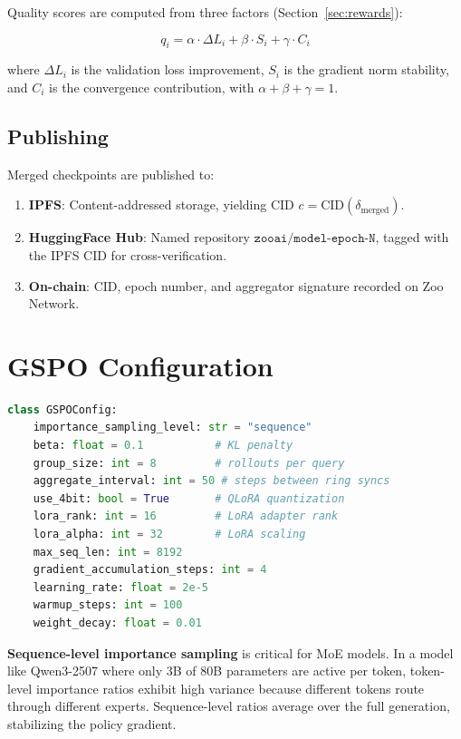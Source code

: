 \documentclass[11pt,letterpaper]{article}
\begin{document}
Quality scores are computed from three factors (Section~\ref{sec:rewards}):

\begin{equation}
    q_i = \alpha \cdot \Delta L_i + \beta \cdot S_i + \gamma \cdot C_i
    \label{eq:quality}
\end{equation}

where $\Delta L_i$ is the validation loss improvement, $S_i$ is the gradient norm stability, and $C_i$ is the convergence contribution, with $\alpha + \beta + \gamma = 1$.

\subsection{Publishing}

Merged checkpoints are published to:

\begin{enumerate}
    \item \textbf{IPFS}: Content-addressed storage, yielding CID $c = \text{CID}(\delta_{\text{merged}})$.
    \item \textbf{HuggingFace Hub}: Named repository $\texttt{zooai/model-epoch-N}$, tagged with the IPFS CID for cross-verification.
    \item \textbf{On-chain}: CID, epoch number, and aggregator signature recorded on Zoo Network.
\end{enumerate}

\section{GSPO Configuration}
\label{sec:gspo-config}

\begin{lstlisting}[language=python,caption=GSPO training configuration]
class GSPOConfig:
    importance_sampling_level: str = "sequence"
    beta: float = 0.1           # KL penalty
    group_size: int = 8         # rollouts per query
    aggregate_interval: int = 50 # steps between ring syncs
    use_4bit: bool = True       # QLoRA quantization
    lora_rank: int = 16         # LoRA adapter rank
    lora_alpha: int = 32        # LoRA scaling
    max_seq_len: int = 8192
    gradient_accumulation_steps: int = 4
    learning_rate: float = 2e-5
    warmup_steps: int = 100
    weight_decay: float = 0.01
\end{lstlisting}

\textbf{Sequence-level importance sampling} is critical for MoE models.  In a model like Qwen3-2507 where only 3B of 80B parameters are active per token, token-level importance ratios exhibit high variance because different tokens route through different experts.  Sequence-level ratios average over the full generation, stabilizing the policy gradient.
\end{document}
